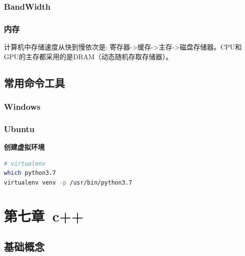 \documentclass[12pt]{book}
\begin{document}
\subsection{BandWidth}

\subsection{内存}
计算机中存储速度从快到慢依次是: 寄存器->缓存->主存->磁盘存储器。CPU和GPU的主存都采用的是DRAM（动态随机存取存储器）。

\section{常用命令工具}
\subsection{Windows}
\subsection{Ubuntu}
\textbf{创建虚拟环境}
\begin{lstlisting}[language=bash]
# virtualenv
which python3.7
virtualenv venv -p /usr/bin/python3.7
\end{lstlisting}

\newpage

\fancyhead{}

\chapter{第七章\ c++}

\section{基础概念}
\end{document}
